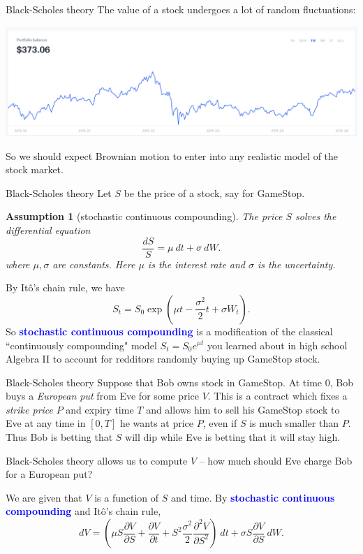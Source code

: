 \documentclass[10pt]{beamer}
\newtheorem{assumption}{Assumption}
\newcommand{\attn}[1]{\textbf{\textcolor{blue}{#1}}}
\begin{document}
\begin{frame}{Black-Scholes theory}
The value of a stock undergoes a lot of random fluctuations:

\begin{center}
\includegraphics[scale=0.3]{HODL}
\end{center}

So we should expect Brownian motion to enter into any realistic model of the stock market.
\end{frame}

\begin{frame}{Black-Scholes theory}
Let $S$ be the price of a stock, say for GameStop.
\begin{assumption}[stochastic continuous compounding]
The price $S$ solves the differential equation
$$\frac{dS}{S} = \mu ~dt + \sigma ~dW.$$
where $\mu,\sigma$ are constants. Here $\mu$ is the interest rate and $\sigma$ is the uncertainty.
\end{assumption}
By It\^o's chain rule, we have
$$S_t = S_0 \exp\left(\mu t - \frac{\sigma^2}{2} t + \sigma W_t\right).$$
So \attn{stochastic continuous compounding} is a modification of the classical ``continuously compounding" model $S_t = S_0 e^{\mu t}$ you learned about in high school Algebra II to account for redditors randomly buying up GameStop stock.
\end{frame}

\begin{frame}{Black-Scholes theory}
Suppose that Bob owns stock in GameStop. At time $0$, Bob buys a \emph{European put} from Eve for some price $V$. This is a contract which fixes a \emph{strike price} $P$ and expiry time $T$ and allows him to sell his GameStop stock to Eve at any time in $[0, T]$ he wants at price $P$, even if $S$ is much smaller than $P$.
Thus Bob is betting that $S$ will dip while Eve is betting that it will stay high.

Black-Scholes theory allows us to compute $V$ -- how much should Eve charge Bob for a European put?

We are given that $V$ is a function of $S$ and time. By \attn{stochastic continuous compounding} and It\^o's chain rule,
$$dV = \left(\mu S \frac{\partial V}{\partial S} + \frac{\partial V}{\partial t} + S^2 \frac{\sigma^2}{2} \frac{\partial^2 V}{\partial S^2}\right) ~dt + \sigma S \frac{\partial V}{\partial S} ~dW.$$
\end{frame}
\end{document}
